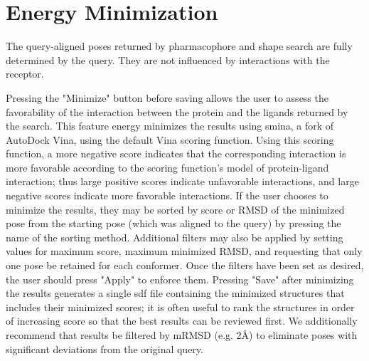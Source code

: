 \section{Energy Minimization}

The query-aligned poses returned by pharmacophore and shape search are fully determined by the query.  They are not influenced by interactions with the receptor.  

\cite{smina}

Pressing the "Minimize" button before saving allows the user to assess the favorability of the interaction between the protein and the ligands returned by the search. This feature energy minimizes the results using smina, a fork of AutoDock Vina, using the default Vina scoring function. Using this scoring function, a more negative score indicates that the corresponding interaction is more favorable according to the scoring function's model of protein-ligand interaction; thus large positive scores indicate unfavorable interactions, and large negative scores indicate more favorable interactions. If the user chooses to minimize the results, they may be sorted by score or RMSD of the minimized pose from the starting pose (which was aligned to the query) by pressing the name of the sorting method. Additional filters may also be applied by setting values for maximum score, maximum minimized RMSD, and requesting that only one pose be retained for each conformer. Once the filters have been set as desired, the user should press "Apply" to enforce them. Pressing "Save" after minimizing the results generates a single sdf file containing the minimized structures that includes their minimized scores; it is often useful to rank the structures in order of increasing score so that the best results can be reviewed first. We additionally recommend that results be filtered by mRMSD (e.g. 2Å) to eliminate poses with significant deviations from the original query. 
